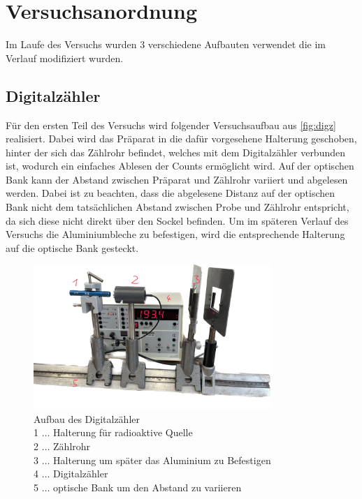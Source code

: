 \documentclass[12pt,english,ngerman]{scrartcl}
\begin{document}
\section{Versuchsanordnung}\label{sec:Versuchsanordnung}

Im Laufe des Versuchs wurden 3 verschiedene Aufbauten verwendet die im Verlauf
modifiziert wurden.

\subsection{Digitalzähler}\label{aufbau_Digz}

Für den ersten Teil des Versuchs wird folgender Versuchsaufbau aus
\autoref{fig:digz} realisiert. Dabei wird das Präparat in die dafür vorgesehene
Halterung geschoben, hinter der sich das Zählrohr befindet, welches mit dem
Digitalzähler verbunden ist, wodurch ein einfaches Ablesen der Counts
ermöglicht wird. Auf der optischen Bank kann der Abstand zwischen Präparat und
Zählrohr variiert und abgelesen werden. Dabei ist zu beachten, dass die
abgelesene Distanz auf der optischen Bank nicht dem tatsächlichen Abstand
zwischen Probe und Zählrohr entspricht, da sich diese nicht direkt über den
Sockel befinden. Um im späteren Verlauf des Versuchs die Aluminiumbleche zu
befestigen, wird die entsprechende Halterung auf die optische Bank gesteckt.

\begin{figure}[H]
	\begin{center}
		\includegraphics[width = 0.8\textwidth]{./figures/digz.png}

	\end{center}
	\caption[Aufbau des Digitalzähler]{Aufbau des Digitalzähler \\
		1 \(\dots\) Halterung für radioaktive Quelle \\
		2 \(\dots\) Zählrohr \\
		3 \(\dots\) Halterung um später das Aluminium zu Befestigen \\
		4 \(\dots\) Digitalzähler \\
		5 \(\dots\) optische Bank um den Abstand zu variieren}
	\label{fig:digz}

\end{figure}
\end{document}
